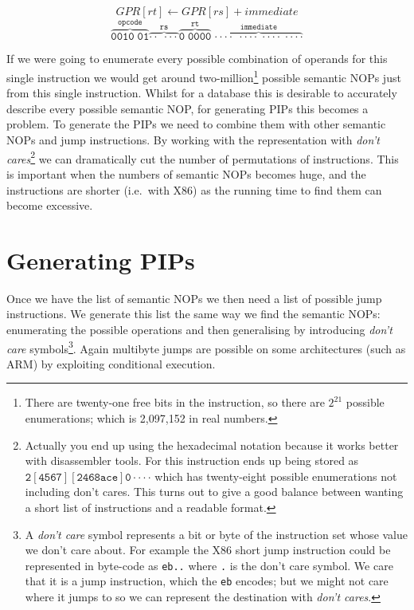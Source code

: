 \documentclass[10pt,]{book}
\begin{document}
\[GPR[rt] \gets GPR[rs] + immediate\]
\[\mathtt{\overbrace{0010\;01}^\text{opcode}
\overbrace{\cdot\cdot\;\cdot\cdot\cdot}^\text{rs}
\overbrace{0\;0000}^\text{rt}\; \overbrace{\cdot\cdot\cdot\cdot\;
\cdot\cdot\cdot\cdot\; \cdot\cdot\cdot\cdot\;
\cdot\cdot\cdot\cdot}^\text{immediate}}\]

If we were going to enumerate every possible combination of operands for
this single instruction we would get around two-million\footnote{There
  are twenty-one free bits in the instruction, so there are $2^{21}$
  possible enumerations; which is 2,097,152 in real numbers.} possible
semantic NOPs just from this single instruction. Whilst for a database
this is desirable to accurately describe every possible semantic NOP,
for generating PIPs this becomes a problem. To generate the PIPs we need
to combine them with other semantic NOPs and jump instructions. By
working with the representation with \emph{don't cares}\footnote{Actually
  you end up using the hexadecimal notation because it works better with
  disassembler tools. For this instruction ends up being stored as
  $\mathtt{2[4567][2468ace]0\cdot\cdot\cdot\cdot}$ which has
  twenty-eight possible enumerations not including don't cares. This
  turns out to give a good balance between wanting a short list of
  instructions and a readable format.} we can dramatically cut the
number of permutations of instructions. This is important when the
numbers of semantic NOPs becomes huge, and the instructions are shorter
(i.e.~with X86) as the running time to find them can become excessive.

\section{Generating PIPs}

Once we have the list of semantic NOPs we then need a list of possible
jump instructions. We generate this list the same way we find the
semantic NOPs: enumerating the possible operations and then generalising
by introducing \emph{don't care} symbols\footnote{A \emph{don't care}
  symbol represents a bit or byte of the instruction set whose value we
  don't care about. For example the X86 short jump instruction could be
  represented in byte-code as \lstinline!eb..! where \lstinline!.! is
  the don't care symbol. We care that it is a jump instruction, which
  the \lstinline!eb! encodes; but we might not care where it jumps to so
  we can represent the destination with \emph{don't cares}.}. Again
multibyte jumps are possible on some architectures (such as ARM) by
exploiting conditional execution.
\end{document}
